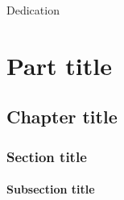 \documentclass[italian,english,counters by chapter]{uniud}
\begin{document}

\frontmatter

\maketitle

\begin{dedication}
	Dedication
\end{dedication}

\begin{acknowledgements}
	\blindtext
\end{acknowledgements}

\begin{abstract}
	\blindtext
\end{abstract}

\begin{otherlanguage}{italian}
	\begin{abstract}
		\blindtext
	\end{abstract}
\end{otherlanguage}

\tableofcontents*


\mainmatter


\part{Part title}

\chapter{Chapter title}
\blindmathtrue

\blindtext

\section{Section title}

\blindtext

\subsection{Subsection title}
\end{document}
